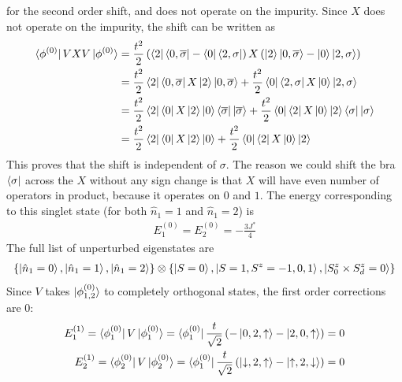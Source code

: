 \documentclass[12pt,twoside]{report}
\numberwithin{equation}{section}
\begin{document}
for the second order shift, and does not operate on the impurity. Since \(X\) does not operate on the impurity, the shift can be written as
\begin{equation}\begin{aligned}
	\bra{\phi^{(0)}} V X V \ket{\phi^{(0)}} &= \frac{t^2}{2}\left(\bra{2}\bra{0,\overline\sigma} - \bra{0}\bra{2,\sigma}\right)X\left(\ket{2}\ket{0,\overline\sigma} - \ket{0}\ket{2,\sigma}\right)\\
		 &= \frac{t^2}{2}\bra{2}\bra{0,\overline\sigma} X\ket{2}\ket{0,\overline\sigma} + \frac{t^2}{2}\bra{0}\bra{2,\sigma}X \ket{0}\ket{2,\sigma}\\
		 &= \frac{t^2}{2}\bra{2}\bra{0} X\ket{2}\ket{0}\bra{\overline\sigma}\ket{\overline\sigma} + \frac{t^2}{2}\bra{0}\bra{2}X \ket{0}\ket{2}\bra{\sigma}\ket{\sigma}\\
		 &= \frac{t^2}{2}\bra{2}\bra{0} X\ket{2}\ket{0} + \frac{t^2}{2}\bra{0}\bra{2}X \ket{0}\ket{2}
\end{aligned}\end{equation}
This proves that the shift is independent of \(\sigma\). The reason we could shift the bra \(\bra{\sigma}\) across the \(X\) without any sign change is that \(X\) will have even number of operators in product, because it operates on \(0\) and \(1\).
\pb The energy corresponding to this singlet state (for both \(\hat n_1=1\) and \(\hat n_1=2\)) is
\begin{equation}\begin{aligned}
	E_1^{(0)} = E_2^{(0)} = -\frac{3J^*}{4}
\end{aligned}\end{equation}
The full list of unperturbed eigenstates are 
\begin{equation}\begin{aligned}
	\left\{\ket{\hat n_1 = 0}, \ket{\hat n_1=1}, \ket{\hat n_1 = 2}\right\} \otimes \left\{ \ket{S=0}, \ket{S=1, S^z=-1,0,1}, \ket{S_0^z \times S_d^z = 0}\right\} 
\end{aligned}\end{equation}
Since \(V\) takes \(\ket{\phi_{1,2}^{(0)}}\) to completely orthogonal states, the first order corrections are 0:
\begin{equation}\begin{aligned}
	E_1^{(1)} = \bra{\phi_1^{(0)}} V \ket{\phi_1^{(0)}} = \bra{\phi_1^{(0)}}\frac{t}{\sqrt 2}\left(-\ket{0, 2 ,\uparrow} - \ket{2, 0, \uparrow}\right)  = 0\\
	E_2^{(1)} = \bra{\phi_2^{(0)}} V \ket{\phi_2^{(0)}} = \bra{\phi_1^{(0)}}\frac{t}{\sqrt 2}\left(\ket{\downarrow, 2 ,\uparrow} - \ket{\uparrow, 2, \downarrow}\right)  = 0
\end{aligned}\end{equation}
\end{document}
